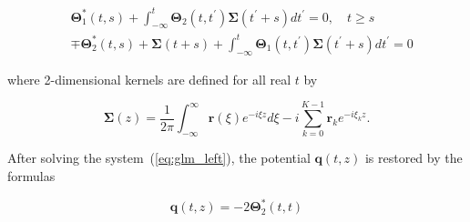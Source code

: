 \begin{equation}
\begin{aligned}
&\mathbf{\Theta}_{1}^{*}(t, s)+\int_{-\infty}^{t} \mathbf{\Theta}_{2}\left(t, t^{\prime}\right) \mathbf{\Sigma}\left(t^{\prime}+s\right) d t^{\prime}=0, \quad t \geq s \\
&\mp \mathbf{\Theta}_{2}^{*}(t, s)+\mathbf{\Sigma}(t+s)+\int_{-\infty}^{t} \mathbf{\Theta}_{1}\left(t, t^{\prime}\right) \mathbf{\Sigma}\left(t^{\prime}+s\right) d t^{\prime}=0
\end{aligned}
\label{eq:glm_left}
\end{equation}

where 2-dimensional kernels are defined for all real $t$ by

\begin{equation}
\mathbf{\Sigma}(z)=\frac{1}{2 \pi} \int_{-\infty}^{\infty} \mathbf{r}(\xi) e^{-i \xi z} d \xi-i \sum_{k=0}^{K-1} \mathbf{r}_{k} e^{-i \xi_{k} z}{.}
\end{equation}


After solving the system~(\ref{eq:glm_left}), the potential $\mathbf{q}(t,z)$ is restored by the formulas

$$
\mathbf{q}(t,z)=-2 \mathbf{\Theta}_{2}^{*}(t, t)
$$


